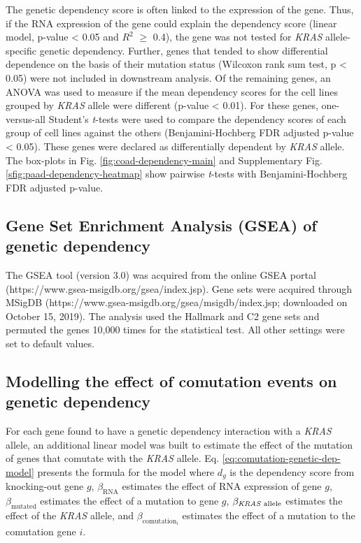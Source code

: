 \documentclass[english, 10pt, letterpaper]{article}
\newcommand{\KRAS}{\emph{KRAS}}
\begin{document}
The genetic dependency score is often linked to the expression of the gene.
Thus, if the RNA expression of the gene could explain the dependency score (linear model, p-value < 0.05 and $R^2$ $\ge$ 0.4), the gene was not tested for \KRAS{} allele-specific genetic dependency.
Further, genes that tended to show differential dependence on the basis of their mutation status (Wilcoxon rank sum test, p < 0.05) were not included in downstream analysis.
Of the remaining genes, an ANOVA was used to measure if the mean dependency scores for the cell lines grouped by \KRAS{} allele were different (p-value < 0.01).
For these genes, one-versus-all Student's \emph{t}-tests were used to compare the dependency scores of each group of cell lines against the others (Benjamini-Hochberg FDR adjusted p-value < 0.05).
These genes were declared as differentially dependent by \KRAS{} allele.
The box-plots in Fig. \ref{fig:coad-dependency-main} and Supplementary Fig. \ref{sfig:paad-dependency-heatmap} show pairwise \emph{t}-tests with Benjamini-Hochberg FDR adjusted p-value.


\subsection*{Gene Set Enrichment Analysis (GSEA) of genetic dependency}
The GSEA tool (version 3.0) was acquired from the online GSEA portal (https://www.gsea-msigdb.org/gsea/index.jsp).
Gene sets were acquired through MSigDB (https://www.gsea-msigdb.org/gsea/msigdb/index.jsp; downloaded on October 15, 2019).
The analysis used the Hallmark and C2 gene sets and permuted the genes 10,000 times for the statistical test.
All other settings were set to default values.


\subsection*{Modelling the effect of comutation events on genetic dependency}

For each gene found to have a genetic dependency interaction with a \KRAS{} allele, an additional linear model was built to estimate the effect of the mutation of genes that comutate with the \KRAS{} allele.
Eq. \ref{eq:comutation-genetic-dep-model} presents the formula for the model where $d_g$ is the dependency score from knocking-out gene $g$, $\beta_{\text{RNA}}$ estimates the effect of RNA expression of gene $g$, $\beta_{\text{mutated}}$ estimates the effect of a mutation to gene $g$, $\beta_{\text{\KRAS{} allele}}$ estimates the effect of the \KRAS{} allele, and $\beta_{\text{comutation}_i}$ estimates the effect of a mutation to the comutation gene $i$.
\end{document}
